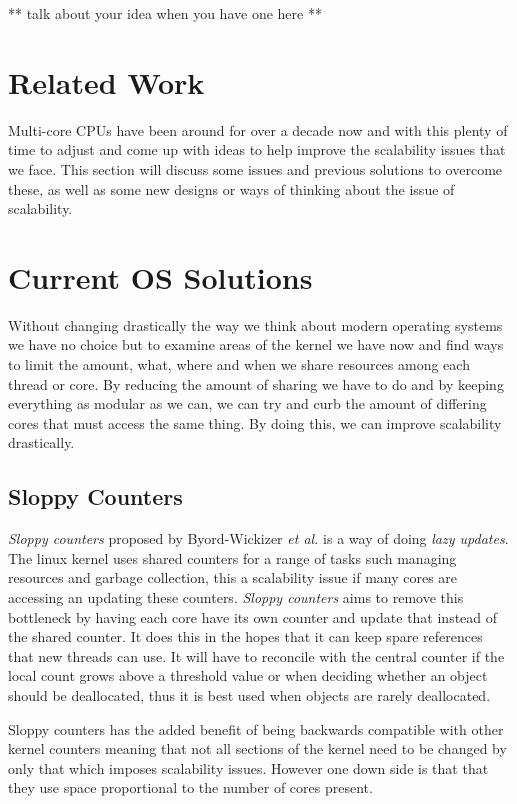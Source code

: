 \documentclass[journal]{IEEEtran}
\begin{document}
** talk about your idea when you have one here **

\section{Related Work}

Multi-core CPUs have been around for over a decade now and with this plenty of time to adjust and come up with ideas to help improve the scalability issues that we face. This section will discuss some issues and previous solutions to overcome these, as well as some new designs or ways of thinking about the issue of scalability. 

\section{Current OS Solutions}

Without changing drastically the way we think about modern operating systems we have no choice but to examine areas of the kernel we have now and find ways to limit the amount, what, where and when we share resources among each thread or core. By reducing the amount of sharing we have to do and by keeping everything as modular as we can, we can try and curb the amount of differing cores that must access the same thing. By doing this, we can improve scalability drastically. 

\subsection{Sloppy Counters}
\emph{Sloppy counters} proposed by Byord-Wickizer \emph{et al.} is a way of doing \emph{lazy updates}. The linux kernel uses shared counters for a range of tasks such managing resources and garbage collection, this a scalability issue if many cores are accessing an updating these counters. \emph{Sloppy counters} aims to remove this bottleneck by having each core have its own counter and update that instead of the shared counter. It does this in the hopes that it can keep spare references that new threads can use. It will have to reconcile with the central counter if the local count grows above a threshold value or when deciding whether an object should be deallocated, thus it is best used when objects are rarely deallocated.  

Sloppy counters has the added benefit of being backwards compatible with other kernel counters meaning that not all sections of the kernel need to be changed by only that which imposes scalability issues. However one down side is that that they use space proportional to the number of cores present.
\end{document}
